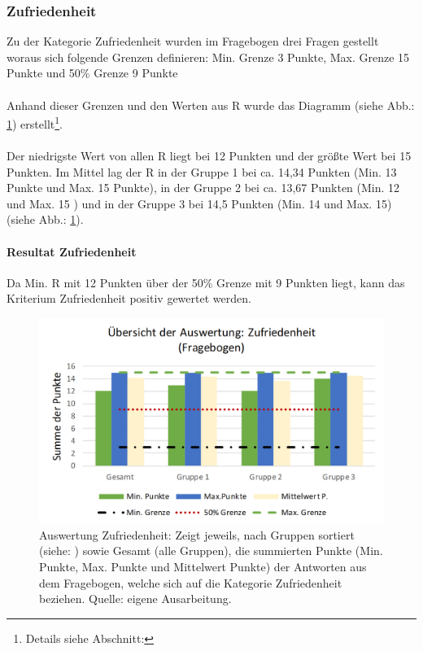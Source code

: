 \documentclass[Bachelorarbeit.tex]{subfiles}
\begin{document}
\subsubsection{Zufriedenheit}
Zu der Kategorie Zufriedenheit wurden im Fragebogen drei Fragen gestellt woraus sich folgende Grenzen definieren: Min. Grenze 3 Punkte, Max. Grenze 15 Punkte und 50\% Grenze 9 Punkte\\
\\
Anhand dieser Grenzen und den Werten aus R wurde das Diagramm  (siehe Abb.: \ref{fig:AuswertungZufriedenheit}) erstellt\footnote{Details siehe Abschnitt: }.\\
\\
Der niedrigste Wert von allen R liegt bei 12 Punkten und der größte Wert bei 15 Punkten.
Im Mittel lag der R in der Gruppe 1 bei ca. 14,34 Punkten (Min. 13 Punkte und Max. 15 Punkte), in der Gruppe 2 bei ca. 13,67 Punkten (Min. 12 und Max. 15 ) und in der Gruppe 3 bei 14,5 Punkten (Min. 14 und Max. 15)\\
(siehe Abb.: \ref{fig:AuswertungZufriedenheit}).

\paragraph{Resultat Zufriedenheit} Da Min. R mit 12 Punkten über der 50\% Grenze mit 9 Punkten liegt, kann das Kriterium Zufriedenheit positiv gewertet werden.
\begin{figure}[H]
\centering
\includegraphics[width=0.9\linewidth]{img/Evaluation/Usability/AuswertungZufriedenheit}
\caption[Übersicht der Zufriedenheit]{Auswertung Zufriedenheit: Zeigt jeweils, nach Gruppen sortiert (siehe: ) sowie Gesamt (alle Gruppen), die summierten Punkte (Min. Punkte, Max. Punkte und Mittelwert Punkte) der Antworten aus dem Fragebogen, welche sich auf die Kategorie Zufriedenheit beziehen. Quelle: eigene Ausarbeitung.}
\label{fig:AuswertungZufriedenheit}
\end{figure}
\end{document}
